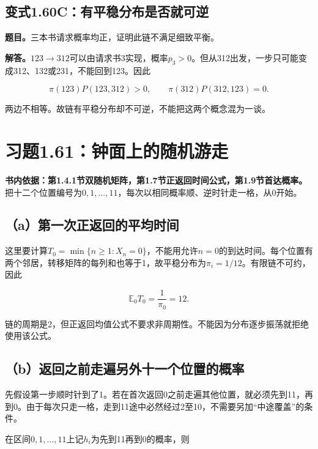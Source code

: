 \documentclass[
  11pt,a4paper,UTF8,fontset=fandol]{ctexart}
\begin{document}
\subsection{变式1.60C：有平稳分布是否就可逆}\label{ux53d8ux5f0f1.60cux6709ux5e73ux7a33ux5206ux5e03ux662fux5426ux5c31ux53efux9006}

\textbf{题目。}三本书请求概率均正，证明此链不满足细致平衡。

\textbf{解答。}\(123\to312\)可以由请求书3实现，概率\(p_3>0\)。但从312出发，一步只可能变成312、132或231，不能回到123。因此

\[
\pi(123)P(123,312)>0,\qquad \pi(312)P(312,123)=0.
\]

两边不相等。故链有平稳分布却不可逆，不能把这两个概念混为一谈。

\section{习题1.61：钟面上的随机游走}\label{ux4e60ux98981.61ux949fux9762ux4e0aux7684ux968fux673aux6e38ux8d70}

\textbf{书内依据：第1.4.1节双随机矩阵，第1.7节正返回时间公式，第1.9节首达概率。}把十二个位置编号为\(0,1,\ldots,11\)，每次以相同概率顺、逆时针走一格，从0开始。

\subsection{（a）第一次正返回的平均时间}\label{aux7b2cux4e00ux6b21ux6b63ux8fd4ux56deux7684ux5e73ux5747ux65f6ux95f4}

这里要计算\(T_0=\min\{n\ge1:X_n=0\}\)，不能用允许\(n=0\)的到达时间。每个位置有两个邻居，转移矩阵的每列和也等于1，故平稳分布为\(\pi_i=1/12\)。有限链不可约，因此

\[
\boxed{\mathbb E_0T_0=\frac1{\pi_0}=12.}
\]

链的周期是2，但正返回均值公式不要求非周期性。不能因为分布逐步振荡就拒绝使用该公式。

\subsection{（b）返回之前走遍另外十一个位置的概率}\label{bux8fd4ux56deux4e4bux524dux8d70ux904dux53e6ux5916ux5341ux4e00ux4e2aux4f4dux7f6eux7684ux6982ux7387}

先假设第一步顺时针到了1。若在首次返回0之前走遍其他位置，就必须先到11，再到0。由于每次只走一格，走到11途中必然经过2至10，不需要另加``中途覆盖''的条件。

在区间\(0,1,\ldots,11\)上记\(h_i\)为先到11再到0的概率，则
\end{document}
